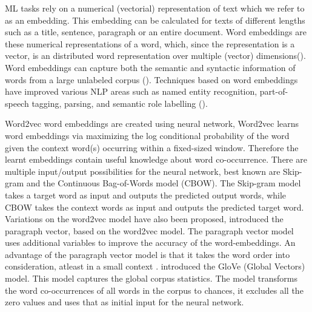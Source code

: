 \documentclass[../../Thesis.tex]{subfiles}
\begin{document}
ML tasks rely on a numerical (vectorial) representation of text which we refer to as an embedding. This embedding can be calculated for texts of different lengths such as a title, sentence, paragraph or an entire document\cite{Karimi2017Deep}. Word embeddings are these numerical representations of a word, which, since the representation is a vector, is an distributed word representation over multiple (vector) dimensions(\citet{mikolov2013distributed}).
Word embeddings can capture both the semantic and syntactic information of words from a large unlabeled corpus (\citet{lai2016generate}).
Techniques based on word embeddings have improved various NLP areas such as named entity recognition, part-of-speech tagging, parsing, and semantic role labelling (\citet{luong2013better}).
\begin{jumpin}
Word2vec word embeddings are created using neural network, Word2vec learns word embeddings via maximizing the log conditional probability of the word given the context word(s) occurring within a fixed-sized window. Therefore the learnt embeddings contain useful knowledge about word co-occurrence\cite{nalisnick2016improving}. There are multiple input/output possibilities for the neural network, best known are Skip-gram and the Continuous Bag-of-Words model (CBOW). The Skip-gram model takes a target word as input and outputs the predicted output words, while CBOW takes the context words as input and outputs the predicted target word\cite{nalisnick2016improving, pennington2014glove}.
Variations on the word2vec model have also been proposed, \citet{le2014distributed} introduced the paragraph vector, based on the word2vec model. The paragraph vector model uses additional variables to improve the accuracy of the word-embeddings. An advantage of the paragraph vector model is that it takes the word order into consideration, atleast in a small context \cite{le2014distributed}.
\citet{pennington2014glove} introduced the GloVe (Global Vectors) model. This model captures the global corpus statistics. The model transforms the word co-occurrences of all words in the corpus to chances, it excludes all the zero values and uses that as initial input for the neural network.\\
\end{jumpin}
\end{document}
